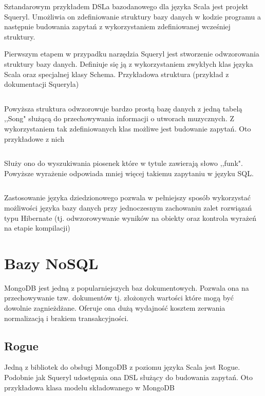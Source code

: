 \documentclass[brudnopis]{xmgr}
\begin{document}
Sztandarowym przykładem DSLa bazodanowego dla języka Scala jest projekt Squeryl. Umożliwia on zdefiniowanie struktury bazy danych w kodzie programu a następnie budowania zapytań z wykorzystaniem zdefiniowanej wcześniej struktury.

Pierwszym etapem w przypadku narzędzia Squeryl jest stworzenie odwzorowania struktury bazy danych. Definiuje się ją z wykorzystaniem zwykłych klas języka Scala oraz specjalnej klasy Schema. Przykładowa struktura (przykład z dokumentacji Squeryla)

\inputminted{scala}{listings/scala/squeryl-schema.scala}

Powyższa struktura odwzorowuje bardzo prostą bazę danych z jedną tabelą ,,Song" służącą do przechowywania informacji o utworach muzycznych. Z wykorzystaniem tak zdefiniowanych klas możliwe jest budowanie zapytań. Oto przykładowe z nich

\inputminted{scala}{listings/scala/squeryl-query.scala}

Służy ono do wyszukiwania piosenek które w tytule zawierają słowo ,,funk". Powyższe wyrażenie odpowiada mniej więcej takiemu zapytaniu w języku SQL.

\inputminted{sql}{listings/sql/squeryl-query.sql}

Zastosowanie języka dziedzionowego pozwala w pełniejszy sposób wykorzystać możliwości języka bazy danych przy jednoczesnym zachowaniu zalet rozwiązań typu Hibernate (tj. odwzorowywanie wyników na obiekty oraz kontrola wyrażeń na etapie kompilacji)

\section{Bazy NoSQL}

MongoDB jest jedną z popularniejszych baz dokumentowych. Pozwala ona na przechowywanie tzw. dokumentów tj. złożonych wartości które mogą być dowolnie zagnieżdżane. Oferuje ona dużą wydajność kosztem zerwania normalizacją i brakiem transakcyjności.

\subsection{Rogue}
Jedną z bibliotek do obsługi MongoDB z poziomu języka Scala jest Rogue. Podobnie jak Squeryl udostępnia ona DSL służący do budowania zapytań. Oto przykładowa klasa modelu składowanego w MongoDB

\inputminted{scala}{listings/scala/rogue-model.scala}
\end{document}
